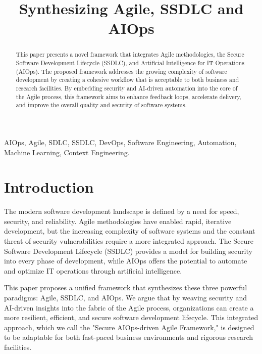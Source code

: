 \documentclass[journal]{IEEEtran}
\begin{document}
\title{Synthesizing Agile, SSDLC and AIOps}

\author{
    \and
}

\maketitle

\begin{abstract}
This paper presents a novel framework that integrates Agile methodologies, the Secure Software Development Lifecycle (SSDLC), and Artificial Intelligence for IT Operations (AIOps). The proposed framework addresses the growing complexity of software development by creating a cohesive workflow that is acceptable to both business and research facilities. By embedding security and AI-driven automation into the core of the Agile process, this framework aims to enhance feedback loops, accelerate delivery, and improve the overall quality and security of software systems.
\end{abstract}

\begin{IEEEkeywords}
AIOps, Agile, SDLC, SSDLC, DevOps, Software Engineering, Automation, Machine Learning, Context Engineering.
\end{IEEEkeywords}

\section{Introduction}
The modern software development landscape is defined by a need for speed, security, and reliability. Agile methodologies have enabled rapid, iterative development, but the increasing complexity of software systems and the constant threat of security vulnerabilities require a more integrated approach. The Secure Software Development Lifecycle (SSDLC) provides a model for building security into every phase of development, while AIOps offers the potential to automate and optimize IT operations through artificial intelligence.

This paper proposes a unified framework that synthesizes these three powerful paradigms: Agile, SSDLC, and AIOps. We argue that by weaving security and AI-driven insights into the fabric of the Agile process, organizations can create a more resilient, efficient, and secure software development lifecycle. This integrated approach, which we call the "Secure AIOps-driven Agile Framework," is designed to be adaptable for both fast-paced business environments and rigorous research facilities.
\end{document}
